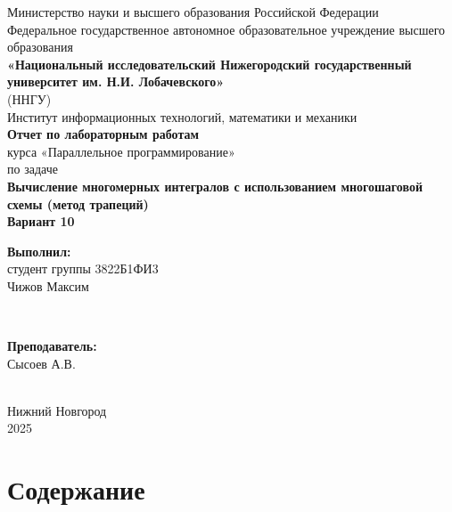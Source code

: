 \documentclass[a4paper,14pt]{article}
\begin{document}
\begin{titlepage}
    \centering
    \large
    Министерство науки и высшего образования Российской Федерации\\[0.5cm]
    Федеральное государственное автономное образовательное учреждение высшего образования\\[0.5cm]
    \textbf{«Национальный исследовательский Нижегородский государственный университет им. Н.И. Лобачевского»}\\
    (ННГУ)\\[1cm]
    Институт информационных технологий, математики и механики\\[0.5cm]

    \vfill
    {\LARGE \textbf{Отчет по лабораторным работам }}\\[0.5cm]
    {\Large курса «Параллельное программирование» }\\[0.5cm]
    {\Large по задаче}\\[0.5cm]
    {\LARGE \textbf{Вычисление многомерных интегралов с использованием многошаговой схемы (метод трапеций)}}\\[0.5cm]
    {\Large \textbf{Вариант 10}}\\[2.5cm]

    \hfill\parbox{0.5\textwidth}{
        \textbf{Выполнил:} \\
        студент группы 3822Б1ФИ3 \\
        Чижов Максим
    }\\[0.5cm]

    \hfill\parbox{0.5\textwidth}{
        \textbf{Преподаватель:} \\
        Сысоев А.В.

    }\\[2cm]

    \vfill
    { Нижний Новгород } \\
    { 2025 }
\end{titlepage}

\newpage
\section*{Содержание}
\end{document}
